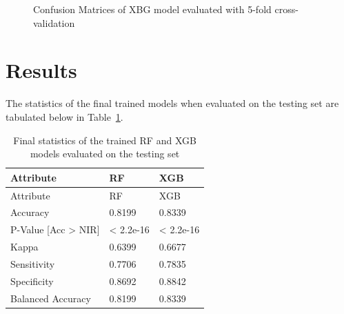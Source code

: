 \documentclass[runningheads]{llncs}
\begin{document}
\begin{figure}
\centering


\caption{Confusion Matrices of XBG model evaluated with 5-fold
cross-validation}

\label{fig:xgb_cf}

\end{figure}

\hypertarget{results}{%
\section{Results}\label{results}}

The statistics of the final trained models when evaluated on the testing
set are tabulated below in Table~\ref{tbl:model_stats}.

\hypertarget{tbl:model_stats}{}
\begin{longtable}[]{@{}lll@{}}
\caption{\label{tbl:model_stats}Final statistics of the trained RF and
XGB models evaluated on the testing set}\tabularnewline
\toprule
Attribute & RF & XGB\tabularnewline
\midrule
\endfirsthead
\toprule
Attribute & RF & XGB\tabularnewline
\midrule
\endhead
Accuracy & 0.8199 & 0.8339\tabularnewline
P-Value {[}Acc \textgreater{} NIR{]} & \textless{} 2.2e-16 & \textless{}
2.2e-16\tabularnewline
Kappa & 0.6399 & 0.6677\tabularnewline
Sensitivity & 0.7706 & 0.7835\tabularnewline
Specificity & 0.8692 & 0.8842\tabularnewline
Balanced Accuracy & 0.8199 & 0.8339\tabularnewline
\bottomrule
\end{longtable}
\end{document}
